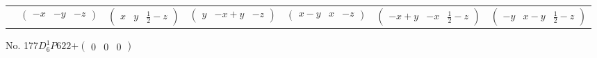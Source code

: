 \documentclass[fleqn,9pt,landscape]{jsarticle}
\begin{document}
\begin{center}
\begin{longtable}{ccccccc}
& $ \begin{pmatrix} - x & - y & - z \end{pmatrix} $ & $ \begin{pmatrix} x & y & \frac{1}{2} - z \end{pmatrix} $ & $ \begin{pmatrix} y & - x + y & - z \end{pmatrix} $ & $ \begin{pmatrix} x - y & x & - z \end{pmatrix} $ & $ \begin{pmatrix} - x + y & - x & \frac{1}{2} - z \end{pmatrix} $ & $ \begin{pmatrix} - y & x - y & \frac{1}{2} - z \end{pmatrix} $ \\
\end{longtable}
\end{center}
\newpage
No. 177\quad$D_{6}^{1}$\quad$P622$\quad[ hexagonal ]\quad$+\begin{pmatrix} 0 & 0 & 0 \end{pmatrix}$
\end{document}
